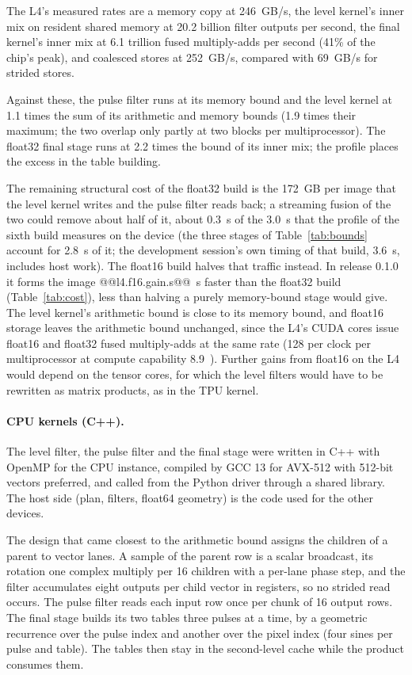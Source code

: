 \documentclass[11pt]{article}
\begin{document}
The L4's measured rates are a memory copy at 246~GB/s, the level kernel's inner mix on resident shared memory at 20.2 billion filter outputs per second, the final kernel's inner mix at 6.1 trillion fused multiply-adds per second (41\% of the chip's peak), and coalesced stores at 252~GB/s, compared with 69~GB/s for strided stores.

Against these, the pulse filter runs at its memory bound and the level kernel at 1.1 times the sum of its arithmetic and memory bounds (1.9 times their maximum; the two overlap only partly at two blocks per multiprocessor). The float32 final stage runs at 2.2 times the bound of its inner mix; the profile places the excess in the table building.

The remaining structural cost of the float32 build is the 172~GB per image that the level kernel writes and the pulse filter reads back; a streaming fusion of the two could remove about half of it, about 0.3~s of the 3.0~s that the profile of the sixth build measures on the device (the three stages of Table~\ref{tab:bounds} account for 2.8~s of it; the development session's own timing of that build, 3.6~s, includes host work). The float16 build halves that traffic instead. In release 0.1.0 it forms the image @@l4.f16.gain.s@@~s faster than the float32 build (Table~\ref{tab:cost}), less than halving a purely memory-bound stage would give. The level kernel's arithmetic bound is close to its memory bound, and float16 storage leaves the arithmetic bound unchanged, since the L4's CUDA cores issue float16 and float32 fused multiply-adds at the same rate (128 per clock per multiprocessor at compute capability 8.9~\cite{cudaguide}). Further gains from float16 on the L4 would depend on the tensor cores, for which the level filters would have to be rewritten as matrix products, as in the TPU kernel.

\paragraph{CPU kernels (C++).} The level filter, the pulse filter and the final stage were written in C++ with OpenMP for the CPU instance, compiled by GCC 13 for AVX-512 with 512-bit vectors preferred, and called from the Python driver through a shared library. The host side (plan, filters, float64 geometry) is the code used for the other devices.

The design that came closest to the arithmetic bound assigns the children of a parent to vector lanes. A sample of the parent row is a scalar broadcast, its rotation one complex multiply per 16 children with a per-lane phase step, and the filter accumulates eight outputs per child vector in registers, so no strided read occurs. The pulse filter reads each input row once per chunk of 16 output rows. The final stage builds its two tables three pulses at a time, by a geometric recurrence over the pulse index and another over the pixel index (four sines per pulse and table). The tables then stay in the second-level cache while the product consumes them.
\end{document}
